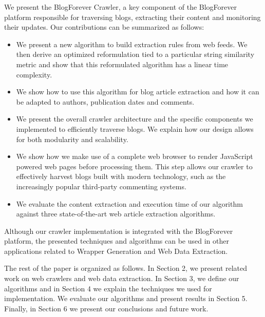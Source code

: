 We present the BlogForever Crawler, a key component of the BlogForever platform \cite{kasioumis2013towards} responsible for traversing blogs, extracting their content and monitoring their updates. Our contributions can be summarized as follows:

\begin{itemize}
  \item We present a new algorithm to build extraction rules from web feeds. We then derive an optimized reformulation tied to a particular string similarity metric and show that this reformulated algorithm has a linear time complexity.
  \item We show how to use this algorithm for blog article extraction and how it can be adapted to authors, publication dates and comments.
  \item We present the overall crawler architecture and the specific components we implemented to efficiently traverse blogs. We explain how our design allows for both modularity and scalability.
  \item We show how we make use of a complete web browser to render JavaScript powered web pages before processing them. This step allows our crawler to effectively harvest blogs built with modern technology, such as the increasingly popular third-party commenting systems.
  \item We evaluate the content extraction and execution time of our algorithm against three state-of-the-art web article extraction algorithms.
\end{itemize}
  

Although our crawler implementation is integrated with the BlogForever platform, the presented techniques and algorithms can be used in other applications related to Wrapper Generation and Web Data Extraction.

The rest of the paper is organized as follows. In Section 2, we present related work on web crawlers and web data extraction. In Section 3, we define our algorithms and in Section 4 we explain the techniques we used for implementation. We evaluate our algorithms and present results in Section 5. Finally, in Section 6 we present our conclusions and future work.
